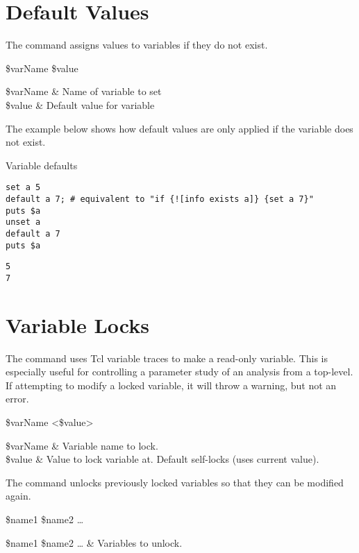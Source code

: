 \documentclass{article}
\begin{document}
\clearpage

\section{Default Values}
The command  assigns values to variables if they do not exist. 

\begin{syntax}
 \$varName \$value
\end{syntax}
\begin{args}
\$varName & Name of variable to set \\
\$value & Default value for variable
\end{args}

The example below shows how default values are only applied if the variable does not exist.

\begin{example}{Variable defaults}
\begin{lstlisting}
set a 5
default a 7; # equivalent to "if {![info exists a]} {set a 7}"
puts $a
unset a
default a 7
puts $a
\end{lstlisting}
\tcblower
\begin{lstlisting}
5
7
\end{lstlisting}
\end{example}
\clearpage
\section{Variable Locks}
The command  uses Tcl variable traces to make a read-only variable. 
This is especially useful for controlling a parameter study of an analysis from a top-level.
If attempting to modify a locked variable, it will throw a warning, but not an error.

\begin{syntax}
 \$varName <\$value>
\end{syntax}
\begin{args}
\$varName & Variable name to lock. \\
\$value & Value to lock variable at. Default self-locks (uses current value).
\end{args}

The command  unlocks previously locked variables so that they can be modified again.

\begin{syntax}
 \$name1 \$name2 …
\end{syntax}
\begin{args}
\$name1 \$name2 … & Variables to unlock.
\end{args}
\end{document}
